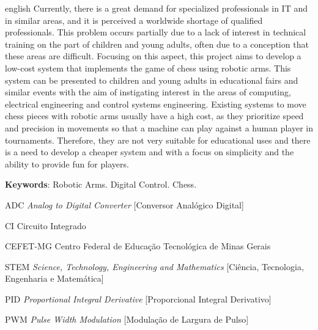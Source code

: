 \begin{resumo}[Abstract]
 \begin{otherlanguage*}{english}
  Currently, there is a great demand for specialized professionals in IT and in similar areas, and it is perceived a worldwide shortage of qualified professionals.
  This problem occurs partially due to a lack of interest in technical training on the part of children and young adults, often due to a conception that these areas are difficult.
  Focusing on this aspect, this project aims to develop a low-cost system that implements the game of chess using robotic arms.
  This system can be presented to children and young adults in educational fairs and similar events with the aim of instigating interest in the areas of computing, electrical engineering and control systems engineering.
  Existing systems to move chess pieces with robotic arms usually have a high cost, as they prioritize speed and precision in movements so that a machine can play against a human player in tournaments.
  Therefore, they are not very suitable for educational uses and there is a need to develop a cheaper system and with a focus on simplicity and the ability to provide fun for players.

   \vspace{\onelineskip} 
   \noindent 
   \textbf{Keywords}: Robotic Arms. Digital Control. Chess.
 \end{otherlanguage*}
\end{resumo}



\listoffigures*
\cleardoublepage

\listoftables*
\cleardoublepage

\begin{siglas}
  \item[ADC] \textit{Analog to Digital Converter} [Conversor Analógico Digital]
  \item[CI] Circuito Integrado
  \item[CEFET-MG] Centro Federal de Educação Tecnológica de Minas Gerais
  \item[STEM] \textit{Science, Technology, Engineering and Mathematics} [Ciência, Tecnologia, Engenharia e Matemática]
  \item[PID] \textit{Proportional Integral Derivative} [Proporcional Integral Derivativo]
  \item[PWM] \textit{Pulse Width Modulation} [Modulação de Largura de Pulso]
\end{siglas}

